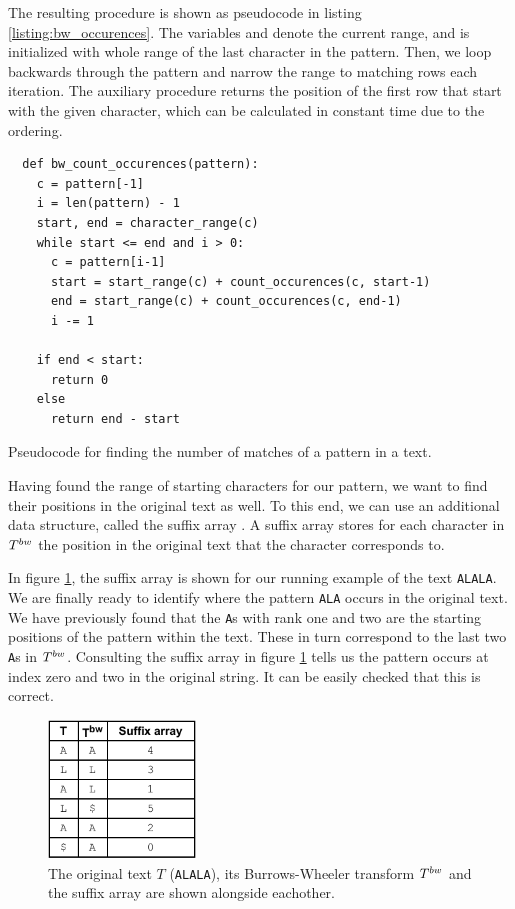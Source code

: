 The resulting procedure  is shown as pseudocode in listing \ref{listing:bw_occurences}.
The variables  and  denote the current range, and is initialized with whole range of the last character in the pattern.
Then, we loop backwards through the pattern and narrow the range to matching rows each iteration.
The auxiliary procedure  returns the position of the first row that start with the given character, which can be calculated in constant time due to the ordering.

\begin{listing}[ht]
\begin{verbatim}
  def bw_count_occurences(pattern):
    c = pattern[-1]
    i = len(pattern) - 1
    start, end = character_range(c)
    while start <= end and i > 0:
      c = pattern[i-1]
      start = start_range(c) + count_occurences(c, start-1)
      end = start_range(c) + count_occurences(c, end-1)
      i -= 1

    if end < start:
      return 0
    else
      return end - start
\end{verbatim}
\caption{Pseudocode for finding the number of matches of a pattern in a text.}
\label{listing:bw_occurences}
\end{listing}

Having found the range of starting characters for our pattern, we want to find their positions in the original text as well.
To this end, we can use an additional data structure, called the suffix array \cite{langmead_burrows-wheeler_1994}.
A suffix array stores for each character in $T^{bw}$ the position in the original text that the character corresponds to.

In figure \ref{fig:bw_suffix_array}, the suffix array is shown for our running example of the text \texttt{ALALA}.
We are finally ready to identify where the pattern \texttt{ALA} occurs in the original text.
We have previously found that the \texttt{A}s with rank one and two are the starting positions of the pattern within the text.
These in turn correspond to the last two \texttt{A}s in $T^{bw}$.
Consulting the suffix array in figure \ref{fig:bw_suffix_array} tells us the pattern occurs at index zero and two in the original string.
It can be easily checked that this is correct.

\begin{figure}[ht]
\centering
\includegraphics[width=0.35\textwidth]{figures/bw_suffix_array.pdf}
\caption{The original text $T$ (\texttt{ALALA}), its Burrows-Wheeler transform $T^{bw}$ and the suffix array are shown alongside eachother.}
\label{fig:bw_suffix_array}
\end{figure}

